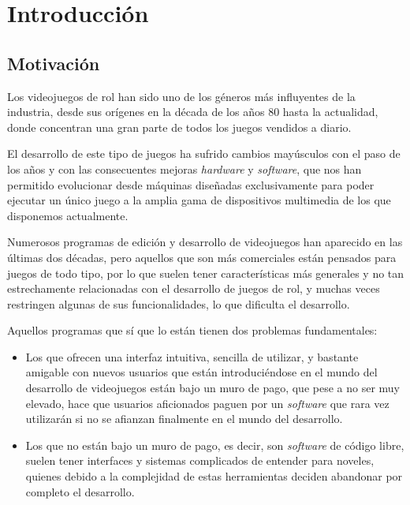\chapter{Introducción}
\label{cap:introduccion}


\section{Motivación}
Los videojuegos de rol han sido uno de los géneros más influyentes de la industria, desde sus orígenes en la década de los años 80 hasta la actualidad, donde concentran una gran parte de todos los juegos vendidos a diario.

\smallskip

El desarrollo de este tipo de juegos ha sufrido cambios mayúsculos con el paso de los años y con las consecuentes mejoras \textit{hardware} y \textit{software}, que nos han permitido evolucionar desde máquinas diseñadas exclusivamente para poder ejecutar un único juego a la amplia gama de dispositivos multimedia de los que disponemos actualmente.

\medskip

Numerosos programas de edición y desarrollo de videojuegos han aparecido en las últimas dos décadas, pero aquellos que son más comerciales están pensados para juegos de todo tipo, por lo que suelen tener características más generales y no tan estrechamente relacionadas con el desarrollo de juegos de rol, y muchas veces restringen algunas de sus funcionalidades, lo que dificulta el desarrollo.

\smallskip

Aquellos programas que sí que lo están tienen dos problemas fundamentales:
\begin{itemize}
	\item Los que ofrecen una interfaz intuitiva, sencilla de utilizar, y bastante amigable con nuevos usuarios que están introduciéndose en el mundo del desarrollo de videojuegos están bajo un muro de pago, que pese a no ser muy elevado, hace que usuarios aficionados paguen por un \textit{software} que rara vez utilizarán si no se afianzan finalmente en el mundo del desarrollo.
	\item Los que no están bajo un muro de pago, es decir, son \textit{software} de código libre, suelen tener interfaces y sistemas complicados de entender para noveles, quienes debido a la complejidad de estas herramientas deciden abandonar por completo el desarrollo.
\end{itemize}

